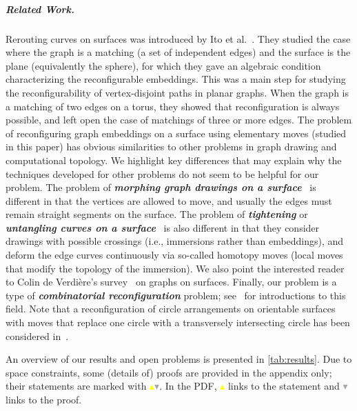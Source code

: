 \documentclass[a4paper,USenglish,cleveref,colorlinks=true,urlcolor=black,linkcolor=black,citecolor=black,thm-restate,authorcolumns]{lipics-v2021}
\theoremstyle{claimstyle}
\def\defn#1{\textit{\textbf{\boldmath #1}}}
\renewcommand{\emph}[1]{\defn{#1}}
\begin{document}
\subparagraph*{Related Work.}
Rerouting curves on surfaces was introduced by Ito et al.\ \cite{ItoIK0MNOO25}.
They studied the case where the graph is a matching (a set of independent edges) and the surface is the plane (equivalently the sphere), for which they gave an algebraic condition characterizing the reconfigurable embeddings.
This was a main step for studying the reconfigurability of vertex-disjoint paths in planar graphs.
When the graph is a matching of two edges on a torus, they showed that reconfiguration is always possible, and left open the case of matchings of three or more edges.
The problem of reconfiguring graph embeddings on a surface using elementary moves (studied in this paper) has obvious similarities to other problems in graph drawing and computational topology.
We highlight key differences that may explain why the techniques developed for other problems do not seem to be helpful for our problem.
%
The problem of \emph{morphing graph drawings on a surface}~\cite{alamdari2017morph,chambers2021morph,ericksonplanar} is different in that the vertices are allowed to move, and usually the edges must remain straight segments on the surface.
The problem of \emph{tightening} or \emph{untangling curves on a surface}~\cite{DBLP:journals/talg/ChangM22,DBLP:journals/dcg/ChangE17,DBLP:conf/soda/Chang0LMSSTT18,de2024untangling} is also different in that they consider drawings with possible crossings (i.e., immersions rather than embeddings), and deform the edge curves continuously via so-called homotopy moves (local moves that modify the topology of the immersion).
We also point the interested reader to Colin de Verdi\`ere's
survey~\cite{de2017computational} on graphs on surfaces.
%
Finally, our problem is a type of \emph{combinatorial reconfiguration} problem; see~\cite{DBLP:journals/algorithms/Nishimura18,DBLP:books/cu/p/Heuvel13} for introductions to this field.
Note that a reconfiguration of circle arrangements on orientable surfaces with moves that replace one circle with a transversely intersecting circle has been considered in~\cite{hatcher1980presentation,lackenby2024bounds}.




An overview of our results and open problems is presented in \cref{tab:results}.
Due to space constraints, some (details of) proofs are provided in the appendix only; their statements are marked with \textcolor{yellow}{$\blacktriangle$}\textcolor{darkgray}{$\blacktriangledown$}.
In the PDF, \textcolor{yellow}{$\blacktriangle$} links to the statement and \textcolor{darkgray}{$\blacktriangledown$} links to the proof.
\end{document}
